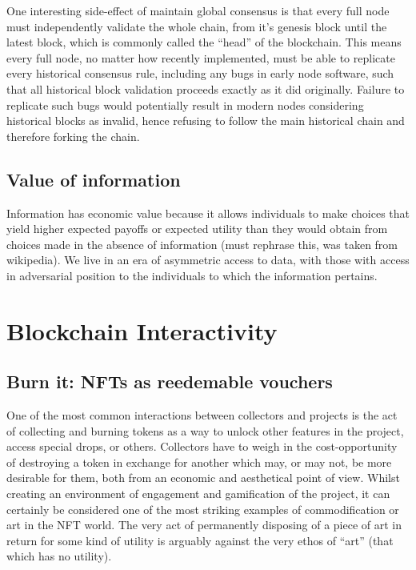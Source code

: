 One interesting side-effect of maintain global consensus is that every full node must independently validate the whole chain, from it's genesis block until the latest block, which is commonly called the ``head'' of the blockchain. This means every full node, no matter how recently implemented, must be able to replicate every historical consensus rule, including any bugs in early node software, such that all historical block validation proceeds exactly as it did originally. Failure to replicate such bugs would potentially result in modern nodes considering historical blocks as invalid, hence refusing to follow the main historical chain and therefore forking the chain.

\subsection{Value of information}

Information has economic value because it allows individuals to make choices that yield higher expected payoffs or expected utility than they would obtain from choices made in the absence of information (must rephrase this, was taken from wikipedia).
We live in an era of asymmetric access to data, with those with access in adversarial position to the individuals to which the information pertains. 


\section{Blockchain Interactivity}



\subsection{Burn it: NFTs as reedemable vouchers}

One of the most common interactions between collectors and projects is the act of collecting and burning tokens as a way to unlock other features in the project, access special drops, or others. Collectors have to weigh in the cost-opportunity of destroying a token in exchange for another which may, or may not, be more desirable for them, both from an economic and aesthetical point of view. Whilst creating an environment of engagement and gamification of the project, it can certainly be considered one of the most striking examples of commodification or art in the NFT world. The very act of permanently disposing of a piece of art in return for some kind of utility is arguably against the very ethos of ``art'' (that which has no utility).

